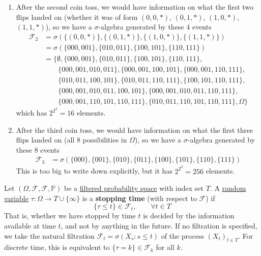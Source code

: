 \begin{example}
\begin{enumerate}
		\item After the second coin toss, we would have information on what the first two flips landed on (whether it was of form $( 0, 0, \ast)$, $( 0, 1, \ast)$, $(1, 0, \ast)$, $(1, 1, \ast)$), so we have a $\sigma$-algebra generated by these 4 events 
		\begin{align}
			\mathcal{F}_2 & = \sigma(\{( 0, 0, \ast)\}, \{( 0, 1, \ast)\}, \{(1, 0, \ast)\}, \{(1, 1, \ast)\}) \\
			& = \sigma(\{000, 001\}, \{010, 011\}, \{100, 101\}, \{110, 111\}) \\
			& = \{\emptyset, \{000, 001\}, \{010, 011\}, \{100, 101\}, \{110, 111\}, \\
			& \qquad \{000, 001, 010, 011\}, \{000, 001, 100, 101\}, \{000, 001, 110, 111\}, \\
			& \qquad \{010, 011, 100, 101\}, \{010, 011, 110, 111\}, \{100, 101, 110, 111\}, \\ 
			& \qquad \{000, 001, 010, 011, 100, 101\}, \{000, 001, 010, 011, 110, 111\}, \\
			& \qquad \{000, 001, 110, 101, 110, 111\}, \{010, 011, 110, 101, 110, 111\},  \Omega\}
		\end{align}
		which has $2^{2^2} = 16$ elements. 
		
		\item After the third coin toss, we would have information on what the first three flips landed on (all 8 possibilities in $\Omega$), so we have a $\sigma$-algebra generated by these 8 events 
		\begin{align}
			\mathcal{F}_3 & = \sigma(\{000\}, \{001\}, \{010\}, \{011\}, \{100\}, \{101\}, \{110\}, \{111\})
		\end{align}
		This is too big to write down explicitly, but it has $2^{2^3} = 256$ elements. 
	\end{enumerate}
\end{example}

\begin{definition}
	\label{def:stopping-time}
	Let $(\Omega, \mathcal{F}, \mathscr{F}, \mathbb{P})$ be a \hyperref[def:filtration]{filtered probability space} with index set $T$. A \hyperref[prob-def:random-variable]{random variable} $\tau \colon \Omega \to T \cup \{\infty\}$ is a \textbf{stopping time} (with respect to $\mathscr{F}$) if 
	\begin{equation}
		\{\tau \leq t\} \in \mathcal{F}_t, \qquad \forall t \in T
	\end{equation}
	That is, whether we have stopped by time $t$ is decided by the information available at time $t$, and not by anything in the future. If no filtration is specified, we take the natural filtration $\mathcal{F}_t = \sigma(X_s : s \leq t)$ of the process $(X_t)_{t \in T}$. For discrete time, this is equivalent to $\{\tau = k\} \in \mathcal{F}_k$ for all $k$. 
\end{definition}


